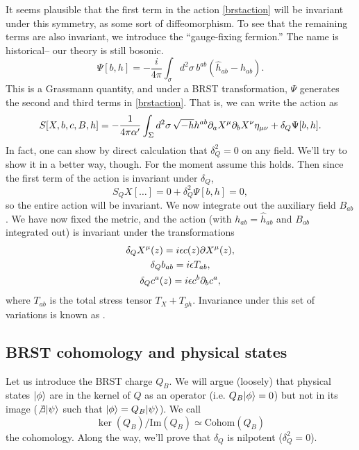 It seems plausible that the first term in the action \ref{brstaction} will be invariant under this symmetry, as some sort of diffeomorphism. To see that the remaining terms are also invariant, we introduce the ``gauge-fixing fermion.'' The name is historical-- our theory is still bosonic.
\begin{equation}
    \Psi[b,h]=-\frac{i}{4\pi}\int_\sigma d^2\sigma\, b^{ab}(\hat h_{ab}-h_{ab}).
\end{equation}
This is a Grassmann quantity, and under a BRST transformation, $\Psi$ generates the second and third terms in \ref{brstaction}. That is, we can write the action as
\begin{equation}
    S[X,b,c,B,h]=-\frac{1}{4\pi \alpha'} \int_\Sigma d^2\sigma \,\sqrt{-h}h^{ab} \partial_a X^\mu \partial_b X^\nu \eta_{\mu\nu}+\delta_Q \Psi[b,h].
\end{equation}
In fact, one can show by direct calculation that $\delta^2_Q=0$ on any field. We'll try to show it in a better way, though. For the moment assume this holds. Then since the first term of the action is invariant under $\delta_Q$,
\begin{equation}
    S_Q X[\ldots]=0+\delta^2_Q \Psi[b,h]=0,
\end{equation}
so the entire action will be invariant. We now integrate out the auxiliary field $B_{ab}$. We have now fixed the metric, and the action (with $h_{ab}=\hat h_{ab}$ and $B_{ab}$ integrated out) is invariant under the transformations
\begin{gather*}
    \delta_Q X^\mu(z)=i\epsilon c(z) \partial X^\mu(z),\\
    \delta_Q b_{ab}=i\epsilon T_{ab},\\
    \delta_Q c^a(z) = i\epsilon c^b \partial_b c^a,
\end{gather*}
where $T_{ab}$ is the total stress tensor $T_X+T_{gh}$. Invariance under this set of variations is known as .

\subsection*{BRST cohomology and physical states}
Let us introduce the BRST charge $Q_B$. We will argue (loosely) that physical states $\lvert\phi\rangle$ are in the kernel of $Q$ as an operator (i.e. $Q_B \lvert\phi\rangle=0$) but not in its image ($\not\exists \lvert\psi\rangle$ such that $\lvert\phi\rangle=Q_B\lvert\psi\rangle$). We call
\begin{equation}
    \ker (Q_B)/\text{Im}(Q_B) \simeq \text{Cohom}(Q_B)
\end{equation}
the cohomology. Along the way, we'll prove that $\delta_Q$ is nilpotent ($\delta_Q^2=0$).

